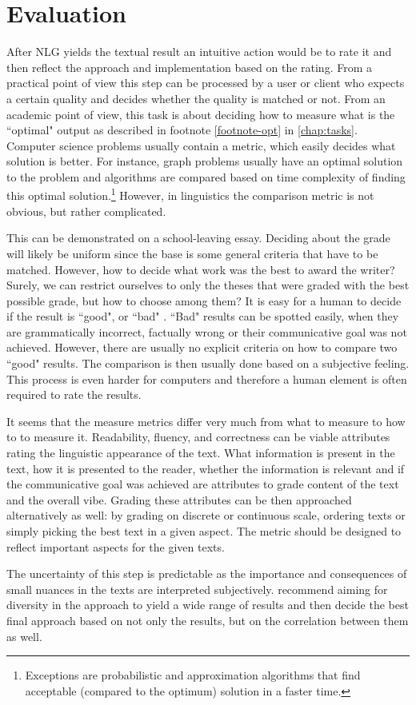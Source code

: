 \section{Evaluation}
 After NLG yields the textual result an intuitive action would be to rate it and then reflect the approach and implementation based on the rating. From a practical point of view this step can be processed by a user or client who expects a certain quality and decides whether the quality is matched or not. From an academic point of view, this task is about deciding how to measure what is the ``optimal" output as described in footnote \ref{footnote-opt} in \ref{chap:tasks}. Computer science problems usually contain a metric, which easily decides what solution is better. For instance, graph problems usually have an optimal solution to the problem and algorithms are compared based on time complexity of finding this optimal solution.\footnote{Exceptions are probabilistic and approximation algorithms that find acceptable (compared to the optimum) solution in a faster time.} However, in linguistics the comparison metric is not obvious, but rather complicated.

This can be demonstrated on a school-leaving essay. Deciding about the grade will likely be uniform since the base is some general criteria that have to be matched. However, how to decide what work was the best to award the writer? Surely, we can restrict ourselves to only the theses that were graded with the best possible grade, but how to choose among them? It is easy for a human to decide if the result is ``good", or ``bad" . ``Bad" results can be spotted easily, when they are grammatically incorrect, factually wrong or their communicative goal was not achieved. However, there are usually no explicit criteria on how to compare two ``good" results. The comparison is then usually done based on a subjective feeling. This process is even harder for computers and therefore a human element is often required to rate the results. 

It seems that the measure metrics differ very much from what to measure to how to to measure it. Readability, fluency, and correctness can be viable attributes rating the linguistic appearance of the text. What information is present in the text, how it is presented to the reader, whether the information is relevant and if the communicative goal was achieved are attributes to grade content of the text and the overall vibe. Grading these attributes can be then approached alternatively as well: by grading on discrete or continuous scale, ordering texts or simply picking the best text in a given aspect. The metric should be designed to reflect important aspects for the given texts.

The uncertainty of this step is predictable as the importance and consequences of small nuances in the texts are interpreted subjectively. \cite{gatt2018survey} recommend aiming for diversity in the approach to yield a wide range of results and then decide the best final approach based on not only the results, but on the correlation between them as well.

